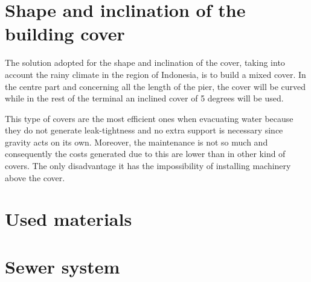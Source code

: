 	\section{Shape and inclination of the building cover}
	
The solution adopted for the shape and inclination of the cover, taking into account the rainy climate in the region of Indonesia, is to build a mixed cover. In the centre part and concerning all the length of the pier, the cover will be curved while in the rest of the terminal an inclined cover of 5 degrees will be used.

This type of covers are the most efficient ones when evacuating water because they do not generate leak-tightness and no extra support is necessary since gravity acts on its own. Moreover, the maintenance is not so much and consequently the costs generated due to this are lower than in other kind of covers. The only disadvantage it has the impossibility of installing machinery above the cover.

	\section{Used materials}
		
	\section{Sewer system}